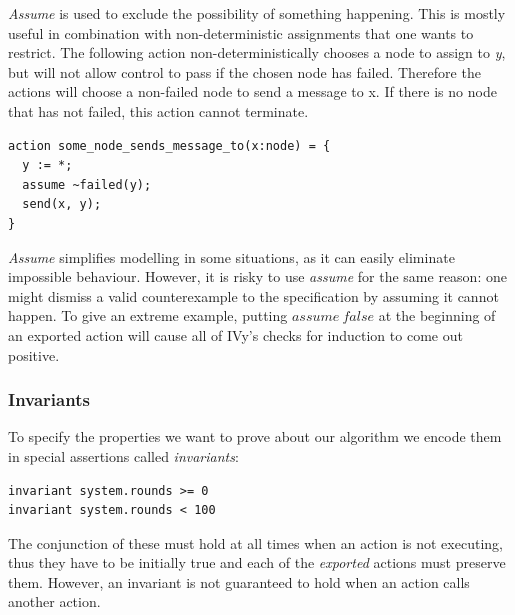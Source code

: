 \documentclass[fleqn]{article}
\begin{document}
\textit{Assume} is used to exclude the possibility of something happening.  This is mostly useful in combination with non-deterministic assignments that one wants to restrict. The following action non-deterministically chooses a node to assign to \textit{y}, but will not allow control to pass if the chosen node has failed. Therefore the actions will choose a non-failed node to send a message to x.  If there is no node that has not failed, this action cannot terminate.

\begin{mdframed}[nobreak=true, backgroundcolor=light-gray, roundcorner=10pt,leftmargin=1, rightmargin=1, innerleftmargin=15, innertopmargin=15,innerbottommargin=15, outerlinewidth=1, linecolor=light-gray]
\begin{lstlisting}
action some_node_sends_message_to(x:node) = {
  y := *;
  assume ~failed(y);
  send(x, y);
}
\end{lstlisting}
\end{mdframed}

\textit{Assume} simplifies modelling in some situations, as it can easily eliminate impossible behaviour. However,
it is risky to use \textit{assume} for the same reason: one might dismiss a valid counterexample to the specification
by assuming it cannot happen. To give an extreme example, putting $assume\ false$ at the beginning of an exported action will cause all of IVy's checks for induction to come out positive.


\subsubsection{Invariants}
To specify the properties we want to prove about our algorithm we encode them in special assertions called \textit{invariants}:

\begin{mdframed}[nobreak=true, backgroundcolor=light-gray, roundcorner=10pt,leftmargin=1, rightmargin=1, innerleftmargin=15, innertopmargin=15,innerbottommargin=15, outerlinewidth=1, linecolor=light-gray]
\begin{lstlisting}
invariant system.rounds >= 0
invariant system.rounds < 100
\end{lstlisting}
\end{mdframed}
The conjunction of these must hold at all times when an action is not executing, thus they have to be initially true and each of
the \textit{exported} actions must preserve them. However, an invariant is not guaranteed to hold when an action calls another action.
\end{document}
